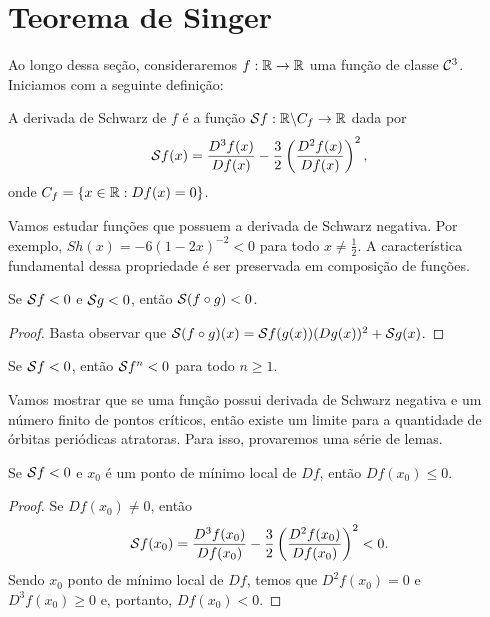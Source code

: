 \section{Teorema de Singer}

Ao longo dessa seção, consideraremos $f: \mathbb{R} \to \mathbb{R}$ uma função de classe $\mathcal{C}^3$. Iniciamos com a seguinte definição: 

\begin{definition}
A derivada de Schwarz de $f$ é a função $\mathcal{S} f: \mathbb{R} \backslash C_f \to \mathbb{R}$ dada por
$$\mathcal{S} f(x) = \frac{D^3 f(x)}{D f(x)} - \frac{3}{2} \left( \frac{D^2 f(x)}{D f(x)} \right)^2,$$
onde $C_f = \lbrace x \in \mathbb{R}: Df(x) = 0 \rbrace$.
\end{definition}

Vamos estudar funções que possuem a derivada de Schwarz negativa. Por exemplo, $Sh(x) = -6(1 - 2x)^{-2} < 0$ para todo $x \neq \frac{1}{2}$. A característica fundamental dessa propriedade é ser preservada em composição de funções.

\begin{proposition}
Se $\mathcal{S} f < 0$ e $\mathcal{S} g < 0$, então $\mathcal{S} (f \circ g) < 0$.
\end{proposition}

\begin{proof}
Basta observar que $\mathcal{S} (f \circ g)(x) = \mathcal{S} f(g(x))(D g(x))^2 + \mathcal{S} g(x)$.
\end{proof}

\begin{corollary}
Se $\mathcal{S} f < 0$, então $\mathcal{S} f^n < 0$ para todo $n \geq 1$.
\end{corollary}

Vamos mostrar que se uma função possui derivada de Schwarz negativa e um número finito de pontos críticos, então existe um limite para a quantidade de órbitas periódicas atratoras. Para isso, provaremos uma série de lemas.

\begin{lemma}\label{lem 10-1}
Se $\mathcal{S} f < 0$ e $x_0$ é um ponto de mínimo local de $D f$, então $D f(x_0) \leq 0$.
\end{lemma}

\begin{proof}
Se $D f(x_0) \neq 0$, então
$$\mathcal{S} f(x_0) = \frac{D^3 f(x_0)}{D f(x_0)} - \frac{3}{2} \left( \frac{D^2 f(x_0)}{D f(x_0)} \right)^2 < 0.$$
Sendo $x_0$ ponto de mínimo local de $D f$, temos que $D^2 f(x_0) = 0$ e $D^3 f(x_0) \geq 0$ e, portanto, $D f(x_0) < 0$. 
\end{proof}

